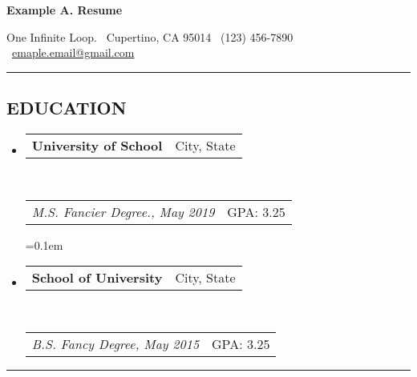 \documentclass[10pt,letterpaper]{article}
\makeatletter
\newcommand{\headerrow}[2]
{\begin{tabular*}{\linewidth}{l@{\extracolsep{\fill}}r}
	#1 &
	#2 \\
\end{tabular*}}
\makeatother
\begin{document}
\begin{center}
{\huge \textbf{Example A. Resume}}
\vspace{0.2em}

One Infinite Loop. \textbullet
\ Cupertino, CA 95014 \textbullet
\ (123) 456-7890\ \ \textbullet
\ \href{mailto:example.email@gmail.com}{emaple.email@gmail.com}
\end{center}
\vspace{-0.4em}
\hrule
\vspace{-0.6em}

\subsection*{EDUCATION}
\vspace{-0.2em}
\begin{itemize}[leftmargin=0cm]
\setlength{\itemsep}{1pt}
  \setlength{\parskip}{0pt}
  \setlength{\parsep}{0pt}
	\parskip=0.1em

	\item[] 
	\headerrow
		{\textbf{University of School}}
		{{City, State}}
	\\
	\headerrow
		{\emph{M.S. Fancier Degree., May 2019}}
		{{GPA: 3.25}}
	
\setlength{\itemsep}{1pt}
  \setlength{\parskip}{0pt}
  \setlength{\parsep}{0pt}
	\parskip=0.1em

	\item[] 
	\headerrow
		{\textbf{School of University}}
		{{City, State}}
	\\
	\headerrow
		{\emph{B.S. Fancy Degree, May 2015}}
		{{GPA: 3.25}}


\vspace{-0.6em}

\end{itemize}

\hrule
\vspace{-0.6em}
\end{document}

